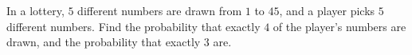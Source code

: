 In a lottery, $5$ different numbers are drawn from $1$ to $45$, and a player picks $5$ different numbers. Find the probability that exactly $4$ of the player's numbers are drawn, and the probability that exactly $3$ are.
